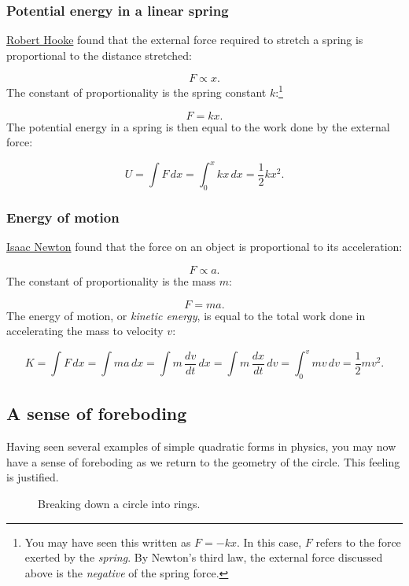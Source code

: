 \documentclass{article}
\begin{document}
    \subsubsection{Potential energy in a linear spring} %
    \label{sec:potential_energy_in_a_linear_spring}

\href{http://en.wikipedia.org/wiki/Robert_Hooke}{Robert Hooke} found that the external force required to stretch a spring is proportional to the distance stretched:

\[ F \propto x. \]
The constant of proportionality is the spring constant $k$:\footnote{You may have seen this written as $F = -kx$. In this case, $F$ refers to the force exerted by the \emph{spring}. By Newton's third law, the external force discussed above is the \emph{negative} of the spring force.}

\[ F = k x. \]
The potential energy in a spring is then equal to the work done by the external force:

\[ U = \int F\,dx = \int_0^x kx\,dx = \textstyle{\frac{1}{2}} kx^2. \]

    \subsubsection{Energy of motion} %

\href{http://en.wikipedia.org/wiki/Isaac_Newton}{Isaac Newton} found that the force on an object is proportional to its acceleration:

\[ F \propto a. \]
The constant of proportionality is the mass $m$:

\[ F = m a. \]
The energy of motion, or \emph{kinetic energy}, is equal to the total work done in accelerating the mass to velocity $v$:

\[ K = \int F\,dx = \int ma\,dx = \int m\,\frac{dv}{dt}\,dx = \int m\, \frac{dx}{dt}\,dv = \int_0^v mv\,dv = \textstyle{\frac{1}{2}} mv^2. \]


  \subsection{A sense of foreboding} %
  \label{sec:a_sense_of_foreboding}

Having seen several examples of simple quadratic forms in physics, you may now have a sense of foreboding as we return to the geometry of the circle. This feeling is justified.

\begin{figure}
\begin{center}
\end{center}
\caption{Breaking down a circle into rings.\label{fig:circular_area}}
\end{figure}
\end{document}
